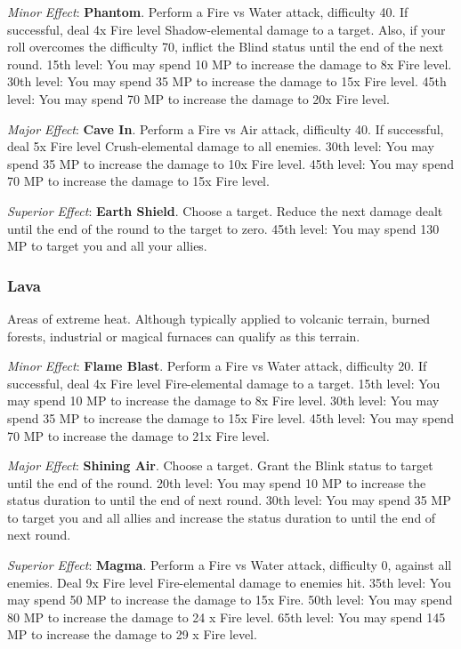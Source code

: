 \begin{multicols}{2}
	\textit{Minor Effect}: \textbf{Phantom}. Perform a Fire vs Water attack, difficulty 40. If successful, deal 4x Fire level Shadow-elemental damage to a target. Also, if your roll overcomes the difficulty 70, inflict the Blind status until the end of the next round. 15th level: You may spend 10 MP to increase the damage to 8x Fire level. 30th level: You may spend 35 MP to increase the damage to 15x Fire level. 45th level: You may spend 70 MP to increase the damage to 20x Fire level.

	\textit{Major Effect}: \textbf{Cave In}. Perform a Fire vs Air attack, difficulty 40. If successful, deal 5x Fire level Crush-elemental damage to all enemies. 30th level: You may spend 35 MP to increase the damage to 10x Fire level. 45th level: You may spend 70 MP to increase the damage to 15x Fire level.

	\textit{Superior Effect}: \textbf{Earth Shield}. Choose a target. Reduce the next damage dealt until the end of the round to the target to zero. 45th level: You may spend 130 MP to target you and all your allies.

    \subsubsection{Lava}

    Areas of extreme heat. Although typically applied to volcanic terrain, burned forests, industrial or magical furnaces can qualify as this terrain.

	\textit{Minor Effect}: \textbf{Flame Blast}. Perform a Fire vs Water attack, difficulty 20. If successful, deal 4x Fire level Fire-elemental damage to a target. 15th level: You may spend 10 MP to increase the damage to 8x Fire level. 30th level: You may spend 35 MP to increase the damage to 15x Fire level. 45th level: You may spend 70 MP to increase the damage to 21x Fire level.

	\textit{Major Effect}: \textbf{Shining Air}. Choose a target. Grant the Blink status to target until the end of the round. 20th level: You may spend 10 MP to increase the status duration to until the end of next round. 30th level: You may spend 35 MP to target you and all allies and increase the status duration to until the end of next round.

	\textit{Superior Effect}: \textbf{Magma}. Perform a Fire vs Water attack, difficulty 0, against all enemies. Deal 9x Fire level Fire-elemental damage to enemies hit. 35th level: You may spend 50 MP to increase the damage to 15x Fire. 50th level: You may spend 80 MP to increase the damage to 24 x Fire level. 65th level: You may spend 145 MP to increase the damage to 29 x Fire level.


\end{multicols}
